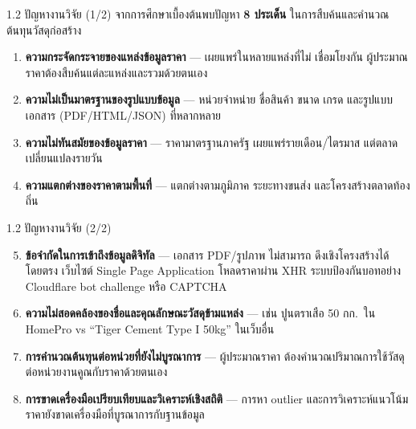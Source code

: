 \documentclass[aspectratio=169,11pt]{beamer}
\begin{document}
\begin{frame}{1.2 ปัญหางานวิจัย (1/2)}
  จากการศึกษาเบื้องต้นพบปัญหา \textbf{8 ประเด็น} ในการสืบค้นและคำนวณต้นทุนวัสดุก่อสร้าง
  \begin{enumerate}
    \item \textbf{ความกระจัดกระจายของแหล่งข้อมูลราคา} --- เผยแพร่ในหลายแหล่งที่ไม่
          เชื่อมโยงกัน ผู้ประมาณราคาต้องสืบค้นแต่ละแหล่งและรวมด้วยตนเอง
    \item \textbf{ความไม่เป็นมาตรฐานของรูปแบบข้อมูล} --- หน่วยจำหน่าย ชื่อสินค้า
          ขนาด เกรด และรูปแบบเอกสาร (PDF/HTML/JSON) ที่หลากหลาย
    \item \textbf{ความไม่ทันสมัยของข้อมูลราคา} --- ราคามาตรฐานภาครัฐ
          เผยแพร่รายเดือน/ไตรมาส แต่ตลาดเปลี่ยนแปลงรายวัน
    \item \textbf{ความแตกต่างของราคาตามพื้นที่} --- แตกต่างตามภูมิภาค ระยะทางขนส่ง
          และโครงสร้างตลาดท้องถิ่น
  \end{enumerate}
\end{frame}

\begin{frame}{1.2 ปัญหางานวิจัย (2/2)}
  \begin{enumerate}
    \setcounter{enumi}{4}
    \item \textbf{ข้อจำกัดในการเข้าถึงข้อมูลดิจิทัล} --- เอกสาร PDF/รูปภาพ ไม่สามารถ
          ดึงเชิงโครงสร้างได้โดยตรง เว็บไซต์ Single Page Application โหลดราคาผ่าน XHR
          ระบบป้องกันบอทอย่าง Cloudflare bot challenge หรือ CAPTCHA
    \item \textbf{ความไม่สอดคล้องของชื่อและคุณลักษณะวัสดุข้ามแหล่ง} --- เช่น
          ปูนตราเสือ 50 กก.\ ใน HomePro vs ``Tiger Cement Type I 50kg'' ในเว็บอื่น
    \item \textbf{การคำนวณต้นทุนต่อหน่วยที่ยังไม่บูรณาการ} --- ผู้ประมาณราคา
          ต้องคำนวณปริมาณการใช้วัสดุต่อหน่วยงานคูณกับราคาด้วยตนเอง
    \item \textbf{การขาดเครื่องมือเปรียบเทียบและวิเคราะห์เชิงสถิติ} --- การหา outlier
          และการวิเคราะห์แนวโน้มราคายังขาดเครื่องมือที่บูรณาการกับฐานข้อมูล
  \end{enumerate}
\end{frame}
\end{document}

